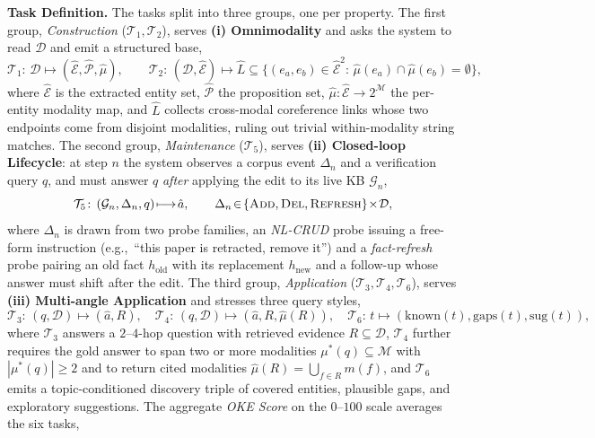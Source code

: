 \documentclass{article}
\begin{document}
\textbf{Task Definition.} The tasks split into three groups, one per property. The first group, \emph{Construction} ($\mathcal{T}_1,\mathcal{T}_2$), serves \textbf{(i) Omnimodality} and asks the system to read $\mathcal{D}$ and emit a structured base,
\begin{equation}
\mathcal{T}_1\!:\,\mathcal{D}\!\longmapsto\!(\hat{\mathcal{E}},\hat{\mathcal{P}},\hat{\mu}),\qquad \mathcal{T}_2\!:\,(\mathcal{D},\hat{\mathcal{E}})\!\longmapsto\!\hat{L}\!\subseteq\!\bigl\{(e_a,e_b)\!\in\!\hat{\mathcal{E}}^{2}\!:\,\hat{\mu}(e_a)\!\cap\!\hat{\mu}(e_b)\!=\!\emptyset\bigr\},
\label{eq:t12}
\end{equation}
where $\hat{\mathcal{E}}$ is the extracted entity set, $\hat{\mathcal{P}}$ the proposition set, $\hat{\mu}\!:\!\hat{\mathcal{E}}\!\to\!2^{\mathcal{M}}$ the per-entity modality map, and $\hat{L}$ collects cross-modal coreference links whose two endpoints come from disjoint modalities, ruling out trivial within-modality string matches. The second group, \emph{Maintenance} ($\mathcal{T}_5$), serves \textbf{(ii) Closed-loop Lifecycle}: at step $n$ the system observes a corpus event $\Delta_n$ and a verification query $q$, and must answer $q$ \emph{after} applying the edit to its live KB $\mathcal{G}_n$,
\begin{equation}
\mathcal{T}_5\!:\,(\mathcal{G}_n,\Delta_n,q)\!\longmapsto\!\hat{a},\qquad \Delta_n\!\in\!\{\textsc{Add},\textsc{Del},\textsc{Refresh}\}\!\times\!\mathcal{D},
\label{eq:t5}
\end{equation}
where $\Delta_n$ is drawn from two probe families, an \emph{NL-CRUD} probe issuing a free-form instruction (e.g.,~``this paper is retracted, remove it'') and a \emph{fact-refresh} probe pairing an old fact $h_{\mathrm{old}}$ with its replacement $h_{\mathrm{new}}$ and a follow-up whose answer must shift after the edit. The third group, \emph{Application} ($\mathcal{T}_3,\mathcal{T}_4,\mathcal{T}_6$), serves \textbf{(iii) Multi-angle Application} and stresses three query styles,
\begin{equation}
\mathcal{T}_3\!:\,(q,\mathcal{D})\!\longmapsto\!(\hat{a},R),\quad \mathcal{T}_4\!:\,(q,\mathcal{D})\!\longmapsto\!(\hat{a},R,\hat{\mu}(R)),\quad \mathcal{T}_6\!:\,t\!\longmapsto\!(\mathrm{known}(t),\mathrm{gaps}(t),\mathrm{sug}(t)),
\label{eq:t346}
\end{equation}
where $\mathcal{T}_3$ answers a $2\text{--}4$-hop question with retrieved evidence $R\!\subseteq\!\mathcal{D}$, $\mathcal{T}_4$ further requires the gold answer to span two or more modalities $\mu^{*}(q)\!\subseteq\!\mathcal{M}$ with $|\mu^{*}(q)|\!\geq\!2$ and to return cited modalities $\hat{\mu}(R)\!=\!\bigcup_{f\in R}m(f)$, and $\mathcal{T}_6$ emits a topic-conditioned discovery triple of covered entities, plausible gaps, and exploratory suggestions. The aggregate \emph{OKE Score} on the $0$--$100$ scale averages the six tasks,
\end{document}
